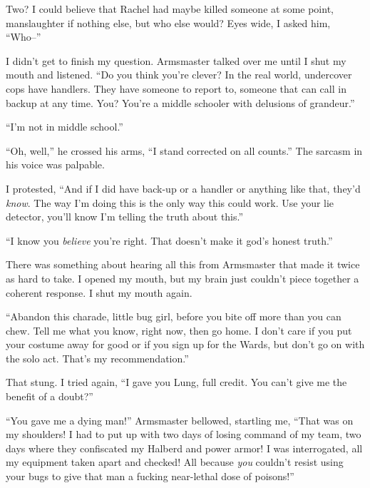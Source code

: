 Two?  I could believe that Rachel had maybe killed someone at some point, manslaughter if nothing else, but who else would?  Eyes wide, I asked him, ``Who--''



I didn't get to finish my question.  Armsmaster talked over me until I shut my mouth and listened.  ``Do you think you're clever?  In the real world, undercover cops have handlers.  They have someone to report to, someone that can call in backup at any time.  You?  You're a middle schooler with delusions of grandeur.''



``I'm not in middle school.''



``Oh, well,'' he crossed his arms, ``I stand corrected on all counts.'' The sarcasm in his voice was palpable.



I protested, ``And if I did have back-up or a handler or anything like that, they'd \emph{know}.  The way I'm doing this is the only way this could work.  Use your lie detector, you'll know I'm telling the truth about this.''



``I know you \emph{believe} you're right.  That doesn't make it god's honest truth.''



There was something about hearing all this from Armsmaster that made it twice as hard to take.  I opened my mouth, but my brain just couldn't piece together a coherent response.  I shut my mouth again.



``Abandon this charade, little bug girl, before you bite off more than you can chew.  Tell me what you know, right now, then go home.  I don't care if you put your costume away for good or if you sign up for the Wards, but don't go on with the solo act.  That's my recommendation.''



That stung.  I tried again, ``I gave you Lung, full credit.  You can't give me the benefit of a doubt?''



``You gave me a dying man!'' Armsmaster bellowed, startling me, ``That was on my shoulders!  I had to put up with two days of losing command of my team, two days where they confiscated my Halberd and power armor!  I was interrogated, all my equipment taken apart and checked!  All because \emph{you} couldn't resist using your bugs to give that man a fucking near-lethal dose of poisons!''



